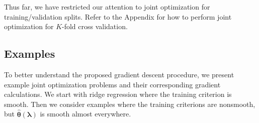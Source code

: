 \documentclass{statsoc}
\begin{document}
\begin{algorithm}
\begin{algorithmic}
	\ENDFOR
  \end{algorithmic}
\end{algorithm}

Thus far, we have restricted our attention to joint optimization for training/validation splits. Refer to the Appendix for how to perform joint optimization for $K$-fold cross validation.

\subsection{Examples}\label{exampleSection}

To better understand the proposed gradient descent procedure, we present example joint optimization problems and their corresponding gradient calculations. We start with ridge regression where the training criterion is smooth. Then we consider examples where the training criterions are nonsmooth, but $\hat{\boldsymbol \theta}(\boldsymbol\lambda)$ is smooth almost everywhere.
\end{document}
